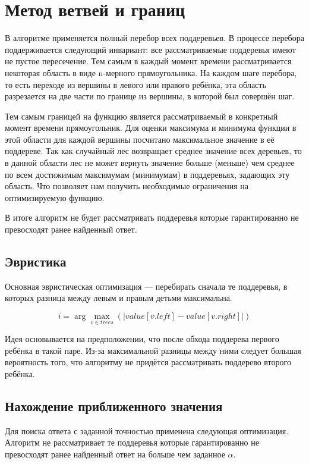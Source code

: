 \section{Метод ветвей и границ}

В алгоритме применяется полный перебор всех поддеревьев. В процессе перебора
поддерживается следующий инвариант: все рассматриваемые поддеревья имеют не
пустое пересечение. Тем самым в каждый момент времени рассматривается некоторая
область в виде n-мерного прямоугольника. На каждом шаге перебора, то есть
переходе из вершины в левого или правого ребёнка, эта область разрезается на две
части по границе из вершины, в которой был совершён шаг.

Тем самым границей на функцию является рассматриваемый в конкретный момент
времени прямоугольник. Для оценки максимума и минимума функции в этой области
для каждой вершины посчитано максимальное значение в её поддереве. Так как
случайный лес возвращает среднее значение всех деревьев, то в данной области лес
не может вернуть значение больше (меньше) чем среднее по всем достижимым
максимумам (минимумам) в поддеревьях, задающих эту область. Что позволяет нам
получить необходимые ограничения на оптимизируемую функцию.

В итоге алгоритм не будет рассматривать поддеревья которые гарантированно не
превосходят ранее найденный ответ.

\subsection{Эвристика}

Основная эвристическая оптимизация --- перебирать сначала те поддеревья,
в которых разница между левым и правым детьми максимальна.

\[
    i = \arg \max_{v \in trees}(|value[v.left] - value[v.right]|)
\]

Идея основывается на предположении, что после обхода поддерева первого ребёнка
в такой паре. Из-за максимальной разницы между ними следует большая вероятность
того, что алгоритму не придётся рассматривать поддерево второго ребёнка.

\subsection{Нахождение приближенного значения}

Для поиска ответа с заданной точностью применена следующая оптимизация. Алгоритм
не рассматривает те поддеревья которые гарантированно не превосходят ранее
найденный ответ на больше чем заданное $\alpha$.

